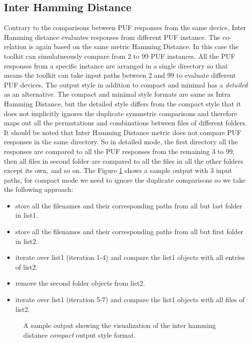 \subsection{Inter Hamming Distance}
\label{inter_hd_section}
Contrary to the comparisons between PUF responses from the same device, Inter Hamming distance evaluates responses from different PUF instance. The co-relation is again based on the same metric Hamming Distance. In this case the toolkit can simulatneously compare from 2 to 99 PUF instances. All the PUF responses from a specific instance are arranged in a single directory so that means the toolkit can take input paths between 2 and 99 to evaluate different PUF devices. The output
style in addition to compact and minimal has a \emph{detailed} as an alternative. The compact and minimal style formats are same as Intra Hamming Distance, but the detailed style differs from the compact style that it does not implicitly ignores the duplicate symmetric comparisons and therefore maps out all the permutations and combinations between files of different folders. It should be noted that Inter Hamming Distance metric does not compare PUF responses in the same directory. So
in detailed mode, the first directory all the responses are compared to all the PUF responses from the remaining 3 to 99, then all files in second folder are compared to all the files in all the other folders except its own, and so on. The Figure \ref{img:inter_output} shows a sample output with 3 input paths, for compact mode we need to ignore the duplicate comparisons so we take the following approach:
\begin{itemize}
	\item store all the filenames and their corresponding paths from all but last folder in list1.
	\item store all the filenames and their corresponding paths from all but first folder in list2.
	\item iterate over list1 (iteration 1-4) and compare the list1 objects with all entries of list2.
	\item remove the second folder objects from list2.
	\item iterate over list1 (iteration 5-7) and compare the list1 objects with all files of list2.
\end{itemize}

\begin{figure}
\centering
{}
\caption{A sample output showing the visualization of the inter hamming distance \emph{compact} output style format.}
\label{img:inter_output}
\end{figure}


